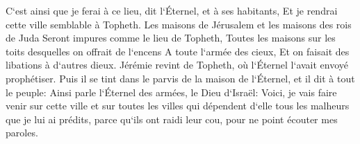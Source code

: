 \verse C`est ainsi que je ferai à ce lieu, dit l`Éternel, et à ses habitants, Et je rendrai cette ville semblable à Topheth. 
\verse Les maisons de Jérusalem et les maisons des rois de Juda Seront impures comme le lieu de Topheth, Toutes les maisons sur les toits desquelles on offrait de l`encens A toute l`armée des cieux, Et on faisait des libations à d`autres dieux. 
\verse Jérémie revint de Topheth, où l`Éternel l`avait envoyé prophétiser. Puis il se tint dans le parvis de la maison de l`Éternel, et il dit à tout le peuple: 
\verse Ainsi parle l`Éternel des armées, le Dieu d`Israël: Voici, je vais faire venir sur cette ville et sur toutes les villes qui dépendent d`elle tous les malheurs que je lui ai prédits, parce qu`ils ont raidi leur cou, pour ne point écouter mes paroles. 

